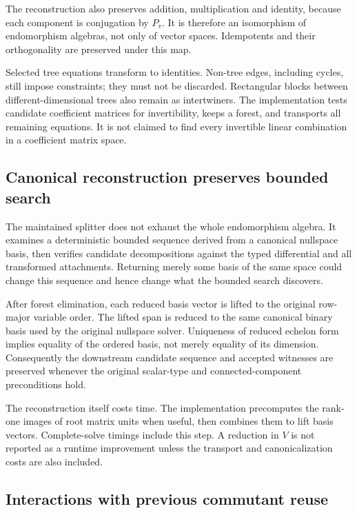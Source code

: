 \documentclass[11pt]{article}
\theoremstyle{definition}
\begin{document}
The reconstruction also preserves addition, multiplication and identity,
because each component is conjugation by $P_v$. It is therefore an
isomorphism of endomorphism algebras, not only of vector spaces.
Idempotents and their orthogonality are preserved under this map.

Selected tree equations transform to identities. Non-tree edges,
including cycles, still impose constraints; they must not be
discarded. Rectangular blocks between different-dimensional trees
also remain as intertwiners. The implementation tests candidate
coefficient matrices for invertibility, keeps a forest, and
transports all remaining equations. It is not claimed to find every
invertible linear combination in a coefficient matrix space.

\subsection{Canonical reconstruction preserves bounded search}

The maintained splitter does not exhaust the whole endomorphism
algebra. It examines a deterministic bounded sequence derived from
a canonical nullspace basis, then verifies candidate decompositions
against the typed differential and all transformed attachments.
Returning merely some basis of the same space could change this
sequence and hence change what the bounded search discovers.

After forest elimination, each reduced basis vector is lifted to
the original row-major variable order. The lifted span is reduced
to the same canonical binary basis used by the original nullspace
solver. Uniqueness of reduced echelon form implies equality of the
ordered basis, not merely equality of its dimension. Consequently
the downstream candidate sequence and accepted witnesses are
preserved whenever the original scalar-type and connected-component
preconditions hold.

The reconstruction itself costs time. The implementation precomputes
the rank-one images of root matrix units when useful, then combines
them to lift basis vectors. Complete-solve timings include this
step. A reduction in $V$ is not reported as a runtime improvement
unless the transport and canonicalization costs are also included.

\subsection{Interactions with previous commutant reuse}
\end{document}
